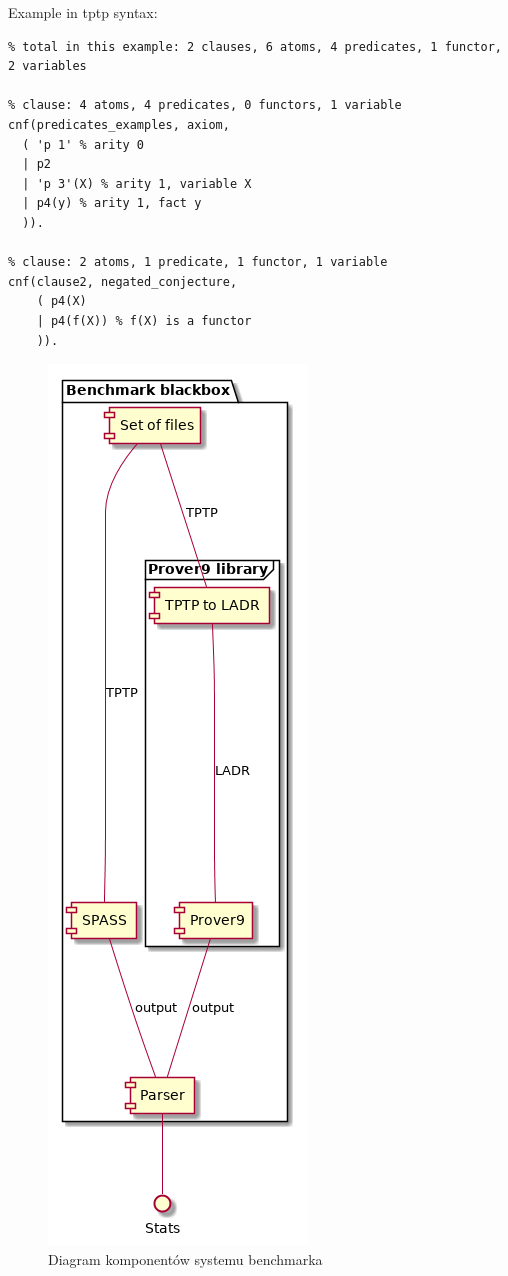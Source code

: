 \documentclass[a4paper,12pt]{article}
\begin{document}
Example in tptp syntax:

\begin{verbatim}
% total in this example: 2 clauses, 6 atoms, 4 predicates, 1 functor, 2 variables

% clause: 4 atoms, 4 predicates, 0 functors, 1 variable
cnf(predicates_examples, axiom,
  ( 'p 1' % arity 0
  | p2
  | 'p 3'(X) % arity 1, variable X
  | p4(y) % arity 1, fact y
  )).

% clause: 2 atoms, 1 predicate, 1 functor, 1 variable
cnf(clause2, negated_conjecture,
    ( p4(X)
    | p4(f(X)) % f(X) is a functor
    )).

\end{verbatim}

\begin{figure}[H]
  \centering
  \includegraphics[scale=0.5]{benchmark/components.png}
  \caption{Diagram komponentów systemu benchmarka}
\end{figure}
\end{document}
